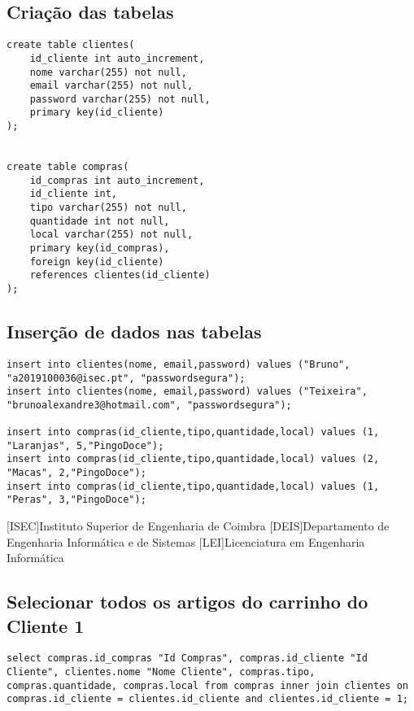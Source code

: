 \documentclass{report}
\begin{document}
\subsection{Criação das tabelas}
\begin{lstlisting}
create table clientes(
    id_cliente int auto_increment,
    nome varchar(255) not null,
    email varchar(255) not null,
    password varchar(255) not null,
    primary key(id_cliente)
);


create table compras(
    id_compras int auto_increment,
    id_cliente int,
    tipo varchar(255) not null,
    quantidade int not null,
    local varchar(255) not null,
    primary key(id_compras),
    foreign key(id_cliente)
    references clientes(id_cliente)
);

\end{lstlisting}

\subsection{Inserção de dados nas tabelas}
\begin{lstlisting}
insert into clientes(nome, email,password) values ("Bruno", "a2019100036@isec.pt", "passwordsegura");
insert into clientes(nome, email,password) values ("Teixeira", "brunoalexandre3@hotmail.com", "passwordsegura");

insert into compras(id_cliente,tipo,quantidade,local) values (1, "Laranjas", 5,"PingoDoce");
insert into compras(id_cliente,tipo,quantidade,local) values (2, "Macas", 2,"PingoDoce");
insert into compras(id_cliente,tipo,quantidade,local) values (1, "Peras", 3,"PingoDoce");
\end{lstlisting}

\begin{acronym}
[ISEC]{Instituto Superior de Engenharia de Coimbra}
[DEIS]{Departamento de Engenharia Informática e de Sistemas}
[LEI]{Licenciatura em Engenharia Informática}
\end{acronym}

\subsection{Selecionar todos os artigos do carrinho do Cliente 1}
\begin{lstlisting}
select compras.id_compras "Id Compras", compras.id_cliente "Id Cliente", clientes.nome "Nome Cliente", compras.tipo, compras.quantidade, compras.local from compras inner join clientes on compras.id_cliente = clientes.id_cliente and clientes.id_cliente = 1;
\end{lstlisting}
\end{document}
